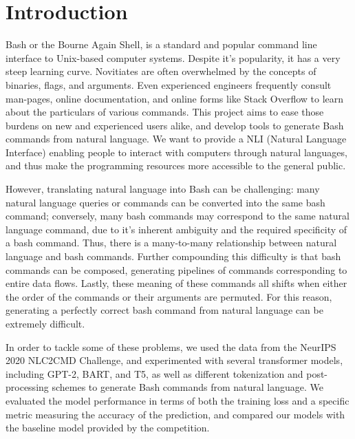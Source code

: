 \section{Introduction}
Bash or the Bourne Again Shell, is a standard and popular command line
interface to Unix-based computer systems. Despite it's popularity, it has a
very steep learning curve. Novitiates are often overwhelmed by the concepts of
binaries, flags, and arguments. Even experienced engineers frequently consult
man-pages, online documentation, and online forms like Stack Overflow to learn
about the particulars of various commands. This project aims to ease those
burdens on new and experienced users alike, and develop tools to generate Bash
commands from natural language. We want to provide a NLI (Natural Language
Interface) enabling people to interact with computers through natural
languages, and thus make the programming resources more accessible to the
general public.
\par
However, translating natural language into Bash can be challenging: many
natural language queries or commands can be converted into the same bash
command; conversely, many bash commands may correspond to the same natural
language command, due to it's inherent ambiguity and the required specificity
of a bash command. Thus, there is a many-to-many relationship between natural
language and bash commands. Further compounding this difficulty is that bash
commands can be composed, generating pipelines of commands corresponding to
entire data flows. Lastly, these meaning of these commands all shifts when
either the order of the commands or their arguments are permuted. For this
reason, generating a perfectly correct bash command from natural language can
be extremely difficult.
\par
In order to tackle some of these problems, we used the data from the NeurIPS
2020 NLC2CMD Challenge, and experimented with several transformer models,
including GPT-2, BART, and T5, as well as different tokenization and
post-processing schemes to generate Bash commands from natural language. We
evaluated the model performance in terms of both the training loss and a
specific metric measuring the accuracy of the prediction, and compared our
models with the baseline model provided by the competition.

